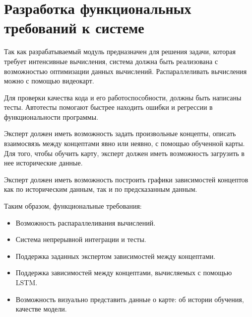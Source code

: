 





\section{Разработка функциональных требований к системе}

Так как разрабатываемый модуль предназначен для решения задачи, которая
требует интенсивные вычисления, система должна быть реализована
с возможностью оптимизации данных вычислений. Распараллеливать вычисления
можно с помощью видеокарт.

Для проверки качества кода и его работоспособности, должны быть написаны тесты.
Автотесты помогают быстрее находить ошибки и регрессии в функциональности программы.

Эксперт должен иметь возможность задать произвольные концепты, описать
взаимосвязь между концептами явно или неявно, с помощью обученной карты.
Для того, чтобы обучить карту, эксперт должен иметь возможность загрузить
в нее исторические данные.

Эксперт должен иметь возможность построить графики зависимостей концептов
как по историческим данным, так и по предсказанным данным.

Таким образом, функциональные требования:
\begin{itemize}
	\item Возможность распараллеливания вычислений.
	\item Система непрерывной интеграции и тесты.
	\item Поддержка заданных экспертом зависимостей между концептами.
	\item Поддержка зависимостей между концептами, вычисляемых с помощью LSTM.
	\item Возможность визуально представить данные о карте: об истории обучения, качестве модели.
\end{itemize}


